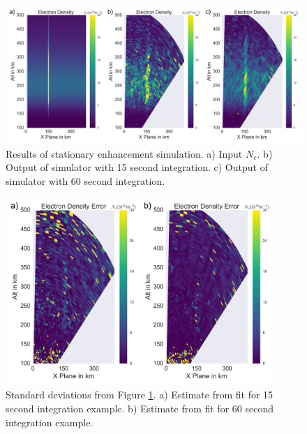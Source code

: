 \documentclass[draft,ras]{agutex}
\begin{document}
\begin{article}
\begin{figure}[!t]
\centering
\includegraphics[width=6in]{stationary}
\caption{Results of stationary enhancement simulation. a) Input $N_e$. b) Output of simulator with 15 second integration. c) Output of simulator with 60 second integration.}
\label{fig:stationaryall}
\end{figure}

\begin{figure}[!t]
\centering
\includegraphics[width=4in]{Errorstationary}
\caption{Standard deviations from Figure \ref{fig:stationaryall}. a)  Estimate from fit for 15 second integration example. b) Estimate from fit for 60 second integration example.}
\label{fig:errorstationaryall}
\end{figure}


\end{article}
\end{document}
